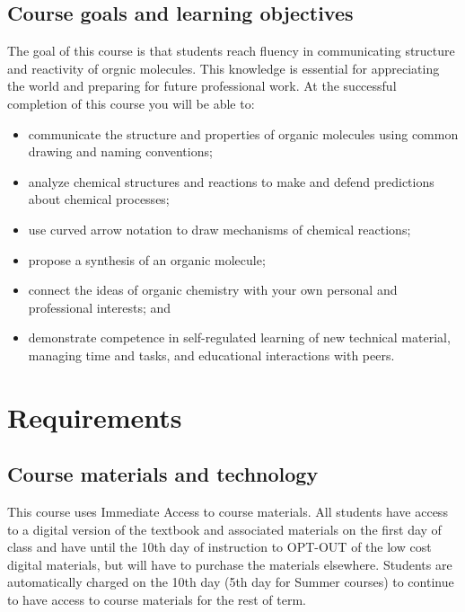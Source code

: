 \hypertarget{course-goals-and-learning-objectives}{%
\subsection{Course goals and learning
objectives}\label{course-goals-and-learning-objectives}}

The goal of this course is that students reach fluency in communicating
structure and reactivity of orgnic molecules. This knowledge is
essential for appreciating the world and preparing for future
professional work. At the successful completion of this course you will
be able to:

\begin{itemize}
\tightlist
\item
  communicate the structure and properties of organic molecules using
  common drawing and naming conventions;
\item
  analyze chemical structures and reactions to make and defend
  predictions about chemical processes;
\item
  use curved arrow notation to draw mechanisms of chemical reactions;
\item
  propose a synthesis of an organic molecule;
\item
  connect the ideas of organic chemistry with your own personal and
  professional interests; and
\item
  demonstrate competence in self-regulated learning of new technical
  material, managing time and tasks, and educational interactions with
  peers.
\end{itemize}

\hypertarget{requirements}{%
\section{Requirements}\label{requirements}}

\hypertarget{course-materials-and-technology}{%
\subsection{Course materials and
technology}\label{course-materials-and-technology}}

This course uses Immediate Access to course materials. All students have
access to a digital version of the textbook and associated materials on
the first day of class and have until the 10th day of instruction to
OPT-OUT of the low cost digital materials, but will have to purchase the
materials elsewhere. Students are automatically charged on the 10th day
(5th day for Summer courses) to continue to have access to course
materials for the rest of term.

